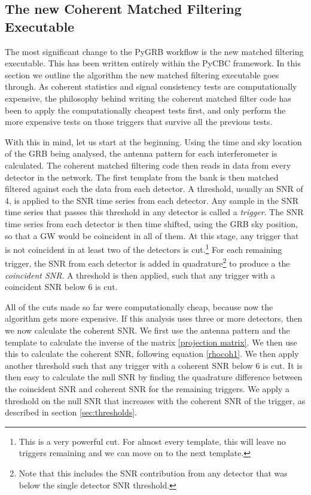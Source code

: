\documentclass[11pt]{cuthesis}
\begin{document}
\subsection{The new Coherent Matched Filtering Executable}
The most significant change to the PyGRB workflow is the new matched filtering executable. This has been written entirely within the PyCBC framework. In this section we outline the algorithm the new matched filtering executable goes through. As coherent statistics and signal consistency tests are computationally expensive, the philosophy behind writing the coherent matched filter code has been to apply the computationally cheapest tests first, and only perform the more expensive tests on those triggers that survive all the previous tests.

With this in mind, let us start at the beginning. Using the time and sky location of the GRB being analysed, the antenna pattern for each interferometer is calculated. The coherent matched filtering code then reads in data from every detector in the network. The first template from the bank is then matched filtered against each the data from each detector. A threshold, usually an SNR of 4, is applied to the SNR time series from each detector. Any sample in the SNR time series that passes this threshold in any detector is called a \textit{trigger}. The SNR time series from each detector is then time shifted, using the GRB sky position, so that a GW would be coincident in all of them. At this stage, any trigger that is not coincident in at least two of the detectors is cut.\footnote{This is a very powerful cut. For almost every template, this will leave no triggers remaining and we can move on to the next template.} For each remaining trigger, the SNR from each detector is added in quadrature\footnote{Note that this includes the SNR contribution from any detector that was below the single detector SNR threshold.} to produce a the \textit{coincident SNR}. A threshold is then applied, such that any trigger with a coincident SNR below 6 is cut. 

All of the cuts made so far were computationally cheap, because now the algorithm gets more expensive. If this analysis uses three or more detectors, then we now calculate the coherent SNR. We first use the antenna pattern and the template to calculate the inverse of the matrix \ref{projection matrix}. We then use this to calculate the coherent SNR, following equation \ref{rhocoh1}. We then apply another threshold such that any trigger with a coherent SNR below 6 is cut. It is then easy to calculate the null SNR by finding the quadrature difference between the coincident SNR and coherent SNR for the remaining triggers. We apply a threshold on the null SNR that increases with the coherent SNR of the trigger, as described in section \ref{sec:thresholds}.
\end{document}
